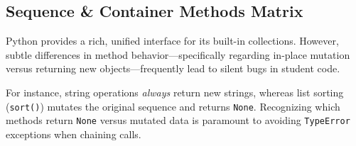 \subsection{Sequence \& Container Methods Matrix}

Python provides a rich, unified interface for its built-in collections. However, subtle differences in method behavior---specifically regarding in-place mutation versus returning new objects---frequently lead to silent bugs in student code.

For instance, string operations \textit{always} return new strings, whereas list sorting (\texttt{sort()}) mutates the original sequence and returns \texttt{None}. Recognizing which methods return \texttt{None} versus mutated data is paramount to avoiding \texttt{TypeError} exceptions when chaining calls.

